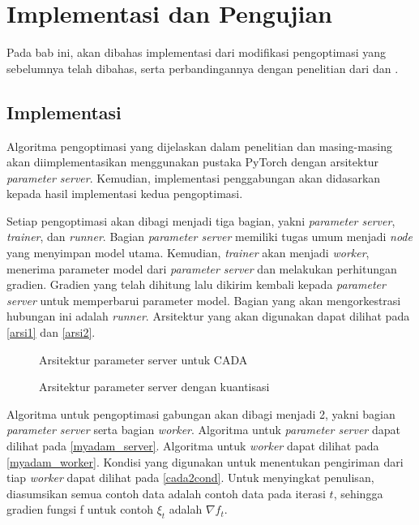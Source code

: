 \chapter{Implementasi dan Pengujian}

Pada bab ini, akan dibahas implementasi dari modifikasi pengoptimasi yang sebelumnya telah dibahas, serta perbandingannya dengan penelitian dari \textcite{Chen2022Efficient} dan \textcite{Chen2021CADA}.

\section{Implementasi}
Algoritma pengoptimasi yang dijelaskan dalam penelitian \textcite{Chen2022Efficient} dan \textcite{Chen2021CADA} masing-masing akan diimplementasikan menggunakan pustaka PyTorch dengan arsitektur \emph{parameter server}. Kemudian, implementasi penggabungan akan didasarkan kepada hasil implementasi kedua pengoptimasi.

Setiap pengoptimasi akan dibagi menjadi tiga bagian, yakni \emph{parameter server}, \emph{trainer}, dan \emph{runner}. Bagian \emph{parameter server} memiliki tugas umum menjadi \emph{node} yang menyimpan model utama. Kemudian, \emph{trainer} akan menjadi \emph{worker}, menerima parameter model dari \emph{parameter server} dan melakukan perhitungan gradien. Gradien yang telah dihitung lalu dikirim kembali kepada \emph{parameter server} untuk memperbarui parameter model. Bagian yang akan mengorkestrasi hubungan ini adalah \emph{runner}. Arsitektur yang akan digunakan dapat dilihat pada \autoref{arsi1} dan \autoref{arsi2}.

\begin{figure}[H]
  \centering
  
  \caption{\label{arsi1}Arsitektur parameter server untuk CADA}
\end{figure}

\begin{figure}[H]
  \centering
  
  \caption{\label{arsi2}Arsitektur parameter server dengan kuantisasi}
\end{figure}

Algoritma untuk pengoptimasi gabungan akan dibagi menjadi 2, yakni bagian \textit{parameter server} serta bagian \textit{worker}. Algoritma untuk \textit{parameter server} dapat dilihat pada \autoref{myadam_server}. Algoritma untuk \textit{worker} dapat dilihat pada \autoref{myadam_worker}. Kondisi yang digunakan untuk menentukan pengiriman dari tiap \textit{worker} dapat dilihat pada \autoref{cada2cond}. Untuk menyingkat penulisan, diasumsikan semua contoh data adalah contoh data pada iterasi $t$, sehingga gradien fungsi f untuk contoh $\xi_t$ adalah $\nabla f_t$.

